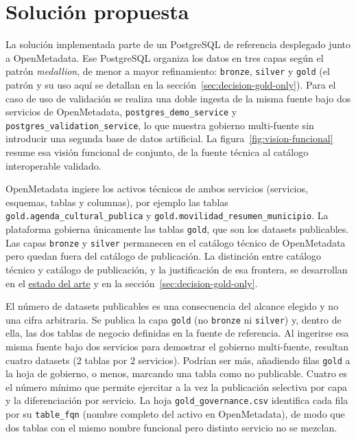 \section{Solución propuesta}

La solución implementada parte de un PostgreSQL de referencia desplegado junto a OpenMetadata. Ese PostgreSQL organiza los datos en tres capas según el patrón \emph{medallion}, de menor a mayor refinamiento: \texttt{bronze}, \texttt{silver} y \texttt{gold} (el patrón y su uso aquí se detallan en la sección~\ref{sec:decision-gold-only}). Para el caso de uso de validación se realiza una doble ingesta de la misma fuente bajo dos servicios de OpenMetadata, \texttt{postgres\_demo\_service} y \texttt{postgres\_validation\_service}, lo que muestra gobierno multi-fuente sin introducir una segunda base de datos artificial. La figura~\ref{fig:vision-funcional} resume esa visión funcional de conjunto, de la fuente técnica al catálogo interoperable validado.


OpenMetadata ingiere los activos técnicos de ambos servicios (servicios, esquemas, tablas y columnas), por ejemplo las tablas \texttt{gold.agenda\_cultural\_publica} y \texttt{gold.movilidad\_resumen\_municipio}. La plataforma gobierna únicamente las tablas \texttt{gold}, que son los datasets publicables. Las capas \texttt{bronze} y \texttt{silver} permanecen en el catálogo técnico de OpenMetadata pero quedan fuera del catálogo de publicación. La distinción entre catálogo técnico y catálogo de publicación, y la justificación de esa frontera, se desarrollan en el \hyperref[cap:estado-arte]{estado del arte} y en la sección~\ref{sec:decision-gold-only}.

El número de datasets publicables es una consecuencia del alcance elegido y no una cifra arbitraria. Se publica la capa \texttt{gold} (no \texttt{bronze} ni \texttt{silver}) y, dentro de ella, las dos tablas de negocio definidas en la fuente de referencia. Al ingerirse esa misma fuente bajo dos servicios para demostrar el gobierno multi-fuente, resultan cuatro datasets ($2$ tablas por $2$ servicios). Podrían ser más, añadiendo filas \texttt{gold} a la hoja de gobierno, o menos, marcando una tabla como no publicable. Cuatro es el número mínimo que permite ejercitar a la vez la publicación selectiva por capa y la diferenciación por servicio. La hoja \texttt{gold\_governance.csv} identifica cada fila por su \texttt{table\_fqn} (nombre completo del activo en OpenMetadata), de modo que dos tablas con el mismo nombre funcional pero distinto servicio no se mezclan.


